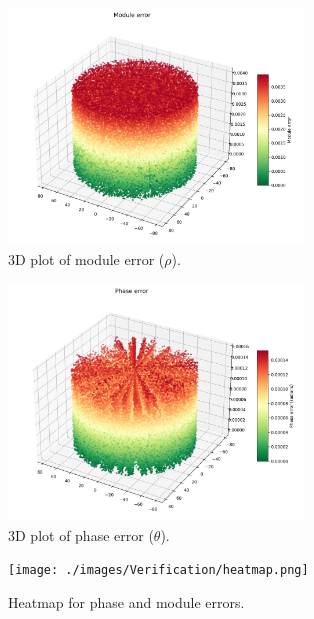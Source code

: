\begin{figure}[!ht]
    \centering
    \includegraphics[width=0.7\textwidth]{./images/Verification/module_error.png}
    \caption{3D plot of module error (\( \rho \)).}
    \label{fig:module_error}
\end{figure}

\begin{figure}[!ht]
    \centering
    \includegraphics[width=0.7\textwidth]{./images/Verification/phase_error.png}
    \caption{3D plot of phase error (\( \theta \)).}
    \label{fig:phase_error}
\end{figure}

\begin{figure}[!ht]
    \centering
    \texttt{[image: ./images/Verification/heatmap.png]}
    \caption{Heatmap for phase and module errors.}
    \label{fig:heatmap_error}
\end{figure}


